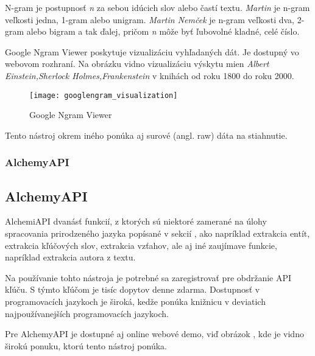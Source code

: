 N-gram je postupnosť \textit{n} za sebou idúcich slov alebo častí textu. \textit{Martin} je n-gram veľkosti jedna, 1-gram alebo unigram. \textit{Martin Nemček} je n-gram veľkosti dva, 2-gram alebo bigram a tak ďalej, pričom \textit{n} môže byť ľubovolné kladné, celé číslo.

Google Ngram Viewer poskytuje vizualizáciu vyhľadaných dát. Je dostupný vo webovom rozhraní. Na obrázku  vidno vizualizáciu výskytu mien \textit{Albert Einstein,Sherlock Holmes,Frankenstein} v knihách od roku 1800 do roku 2000.

\begin{figure}[H]
\begin{center}\texttt{[image: googlengram\_visualization]}\end{center}
\caption[Google Ngram Viewer]{Google Ngram Viewer}\label{fig:googlengram_visualization}
\end{figure}

Tento nástroj okrem iného ponúka aj surové (angl. raw) dáta na stiahnutie.

{
	\subsubsection{AlchemyAPI}
}
{
	\subsection{AlchemyAPI}
}
\label{subsubsec:alchemyapi}
AlchemiAPI dvanásť funkcií, z ktorých sú niektoré zamerané na úlohy spracovania prirodzeného jazyka popísané v sekcií , ako napríklad extrakcia entít, extrakcia kľúčových slov, extrakcia vzťahov, ale aj iné zaujímave funkcie, napríklad extrakcia autora z textu.

Na používanie tohto nástroja je potrebné sa zaregistrovať pre obdržanie API kľúču. S týmto kľúčom je tisíc dopytov denne zdarma. Dostupnosť v programovacích jazykoch je široká, kedže ponúka knižnicu v deviatich najpoužívanejších programovacích jazykoch.

Pre AlchemyAPI je dostupné aj online webové demo, viď obrázok , kde je vidno širokú ponuku, ktorú tento nástroj ponúka.

